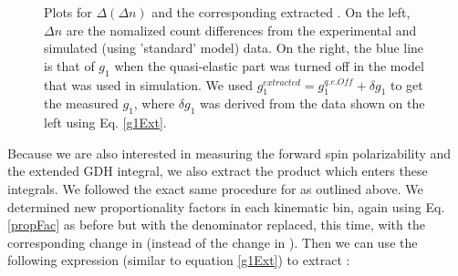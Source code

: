 \begin{figure}[h]
\centering
\label{dDnCSng1q7} %
\caption[Optional caption for list of figures]{Plots for $\Delta (\Delta n)$ and the corresponding extracted \gone. On the left, $\Delta n$ are the nomalized count differences from the experimental and simulated (using 'standard' model) data. On the right, the blue line is that of $g_1$ when the quasi-elastic part was turned off in the model that was used in simulation. We used $g_1^{extracted} = g_1^{q.e. Off} + \delta g_1$ to get the measured $g_1$, where $\delta g_1$ was derived from the data shown on the left using Eq. \ref{g1Ext}.}
\end{figure}





Because we are also interested in measuring the forward spin polarizability and the extended GDH integral, we also extract the product \afones which enters these integrals. We followed the exact same procedure for \gones as outlined above. %
We determined new proportionality factors in each kinematic bin, again using Eq. \ref{propFac} as before but with the denominator replaced, this time, with the corresponding change in \afones (instead of the change in \gone). Then we can use the following expression (similar to equation \ref{g1Ext}) to extract \afonewq:

